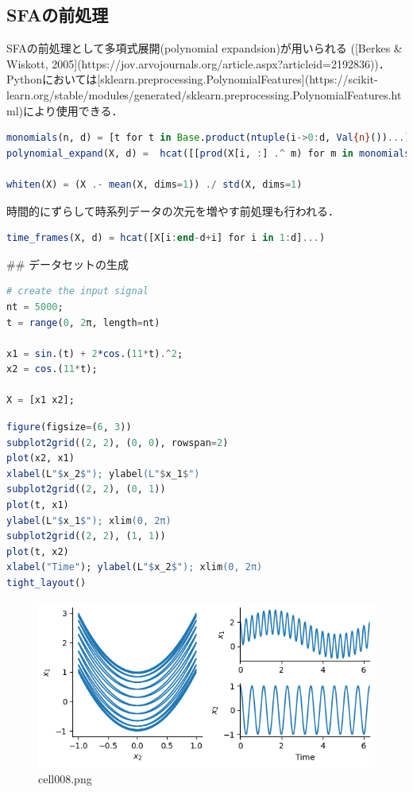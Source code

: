 \subsection{SFAの前処理}
SFAの前処理として多項式展開(polynomial expandsion)が用いられる ([Berkes & Wiskott, 2005](https://jov.arvojournals.org/article.aspx?articleid=2192836))．Pythonにおいては[sklearn.preprocessing.PolynomialFeatures](https://scikit-learn.org/stable/modules/generated/sklearn.preprocessing.PolynomialFeatures.html)により使用できる．
\begin{lstlisting}[language=julia]
monomials(n, d) = [t for t in Base.product(ntuple(i->0:d, Val{n}())...) if sum(t)<=d && sum(t) > 0]
polynomial_expand(X, d) =  hcat([[prod(X[i, :] .^ m) for m in monomials(size(X)[2], d)] for i in 1:size(X)[1]]...)'

whiten(X) = (X .- mean(X, dims=1)) ./ std(X, dims=1)
\end{lstlisting}
時間的にずらして時系列データの次元を増やす前処理も行われる．
\begin{lstlisting}[language=julia]
time_frames(X, d) = hcat([X[i:end-d+i] for i in 1:d]...)
\end{lstlisting}
## データセットの生成
\begin{lstlisting}[language=julia]
# create the input signal
nt = 5000;
t = range(0, 2π, length=nt)

x1 = sin.(t) + 2*cos.(11*t).^2;
x2 = cos.(11*t);

X = [x1 x2];
\end{lstlisting}
\begin{lstlisting}[language=julia]
figure(figsize=(6, 3))
subplot2grid((2, 2), (0, 0), rowspan=2)
plot(x2, x1)
xlabel(L"$x_2$"); ylabel(L"$x_1$")
subplot2grid((2, 2), (0, 1))
plot(t, x1)
ylabel(L"$x_1$"); xlim(0, 2π)
subplot2grid((2, 2), (1, 1))
plot(t, x2)
xlabel("Time"); ylabel(L"$x_2$"); xlim(0, 2π)
tight_layout()
\end{lstlisting}
\begin{figure}[ht]
	\centering
	\includegraphics[scale=0.8, max width=\linewidth]{./fig/local-learning-rule/slow-feature-analysis/cell008.png}
	\caption{cell008.png}
	\label{cell008.png}
\end{figure}
